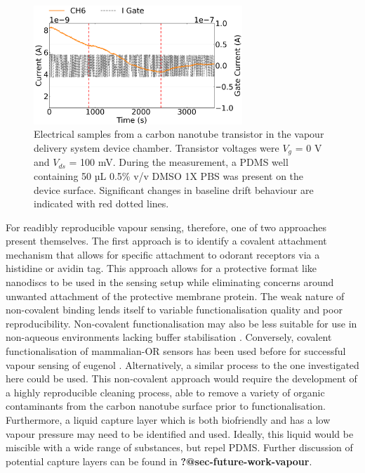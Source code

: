 \documentclass[
  a4paper,
]{scrbook}
\begin{document}
\begin{figure}

{\centering \includegraphics[width=0.7\textwidth,height=\textheight]{figures/ch8/Q39C11.png}

}

\caption{\label{fig-buffer-vapour}Electrical samples from a carbon
nanotube transistor in the vapour delivery system device chamber.
Transistor voltages were \(V_{g}\) = 0 V and \(V_{ds}\) = 100 mV. During
the measurement, a PDMS well containing 50 µL 0.5\% v/v DMSO 1X PBS was
present on the device surface. Significant changes in baseline drift
behaviour are indicated with red dotted lines.}

\end{figure}

For readibly reproducible vapour sensing, therefore, one of two
approaches present themselves. The first approach is to identify a
covalent attachment mechanism that allows for specific attachment to
odorant receptors via a histidine or avidin tag. This approach allows
for a protective format like nanodiscs to be used in the sensing setup
while eliminating concerns around unwanted attachment of the protective
membrane protein. The weak nature of non-covalent binding lends itself
to variable functionalisation quality and poor reproducibility.
Non-covalent functionalisation may also be less suitable for use in
non-aqueous environments lacking buffer stabilisation \autocite{Li2023}.
Conversely, covalent functionalisation of mammalian-OR sensors has been
used before for successful vapour sensing of eugenol
\autocite{Goldsmith2011}. Alternatively, a similar process to the one
investigated here could be used. This non-covalent approach would
require the development of a highly reproducible cleaning process, able
to remove a variety of organic contaminants from the carbon nanotube
surface prior to functionalisation. Furthermore, a liquid capture layer
which is both biofriendly and has a low vapour pressure may need to be
identified and used. Ideally, this liquid would be miscible with a wide
range of substances, but repel PDMS. Further discussion of potential
capture layers can be found in \textbf{?@sec-future-work-vapour}.
\end{document}
